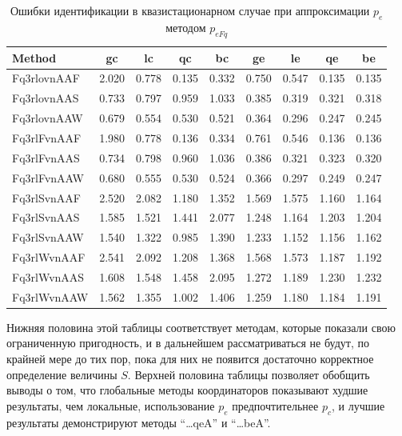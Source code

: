 \begin{table}[htb!]
  \caption{Ошибки идентификации в квазистационарном случае при аппроксимации $p_e$ методом $p_{eFq}$}
  \label{atu:t:err_test_id_Fq}
  \begin{center}
    \begin{tabular}{|l|c|c|c|c|c|c|c|c|}
    \hline
    Method      & gc    & lc    & qc    & bc    & ge     & le    & qe    & be    \\ \hline
    Fq3rlovnAAF & 2.020 & 0.778 & 0.135 & 0.332 & 0.750  & 0.547 & 0.135 & 0.135 \\ \hline
    Fq3rlovnAAS & 0.733 & 0.797 & 0.959 & 1.033 & 0.385  & 0.319 & 0.321 & 0.318 \\ \hline
    Fq3rlovnAAW & 0.679 & 0.554 & 0.530 & 0.521 & 0.364  & 0.296 & 0.247 & 0.245 \\ \hline
    Fq3rlFvnAAF & 1.980 & 0.778 & 0.136 & 0.334 & 0.761  & 0.546 & 0.136 & 0.136 \\ \hline
    Fq3rlFvnAAS & 0.734 & 0.798 & 0.960 & 1.036 & 0.386  & 0.321 & 0.323 & 0.320 \\ \hline
    Fq3rlFvnAAW & 0.680 & 0.555 & 0.530 & 0.524 & 0.366  & 0.297 & 0.249 & 0.247 \\ \hline
    Fq3rlSvnAAF & 2.520 & 2.082 & 1.180 & 1.352 & 1.569  & 1.575 & 1.160 & 1.164 \\ \hline
    Fq3rlSvnAAS & 1.585 & 1.521 & 1.441 & 2.077 & 1.248  & 1.164 & 1.203 & 1.204 \\ \hline
    Fq3rlSvnAAW & 1.540 & 1.322 & 0.985 & 1.390 & 1.233  & 1.152 & 1.156 & 1.162 \\ \hline
    Fq3rlWvnAAF & 2.541 & 2.092 & 1.208 & 1.368 & 1.568  & 1.573 & 1.187 & 1.192 \\ \hline
    Fq3rlWvnAAS & 1.608 & 1.548 & 1.458 & 2.095 & 1.272  & 1.189 & 1.230 & 1.232 \\ \hline
    Fq3rlWvnAAW & 1.562 & 1.355 & 1.002 & 1.406 & 1.259  & 1.180 & 1.184 & 1.191 \\ \hline
    \end{tabular}
  \end{center}
\end{table}

Нижняя половина этой таблицы соответствует методам,
которые показали свою ограниченную пригодность, и в дальнейшем
рассматриваться не будут, по крайней мере до тих пор,
пока для них не появится достаточно корректное определение величины $S$.
Верхней половина таблицы позволяет обобщить выводы о том, что
глобальные методы координаторов показывают худшие результаты, чем локальные,
использование $p_e$ предпочтительнее $p_c$,
и лучшие результаты демонстрируют методы ``\ldots qeA''  и ``\ldots beA''.

